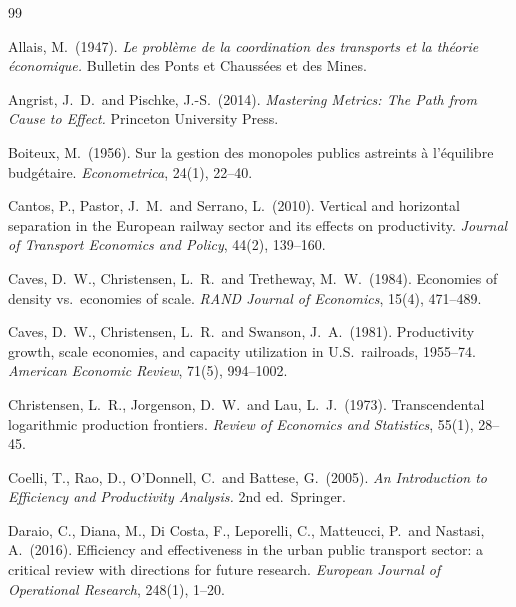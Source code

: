 \documentclass[11pt,a4paper]{article}
\begin{document}

{\small
\begin{thebibliography}{99}

Allais, M.\ (1947).
\textit{Le probl\`{e}me de la coordination des transports et la th\'{e}orie
\'{e}conomique.}
Bulletin des Ponts et Chauss\'{e}es et des Mines.

Angrist, J.~D.\ and Pischke, J.-S.\ (2014).
\textit{Mastering Metrics: The Path from Cause to Effect.}
Princeton University Press.

Boiteux, M.\ (1956).
Sur la gestion des monopoles publics astreints \`{a} l'\'{e}quilibre
budg\'{e}taire.
\textit{Econometrica}, 24(1), 22--40.

Cantos, P., Pastor, J.~M.\ and Serrano, L.\ (2010).
Vertical and horizontal separation in the European railway sector and
its effects on productivity.
\textit{Journal of Transport Economics and Policy}, 44(2), 139--160.

Caves, D.~W., Christensen, L.~R.\ and Tretheway, M.~W.\ (1984).
Economies of density vs.\ economies of scale.
\textit{RAND Journal of Economics}, 15(4), 471--489.

Caves, D.~W., Christensen, L.~R.\ and Swanson, J.~A.\ (1981).
Productivity growth, scale economies, and capacity utilization in U.S.\
railroads, 1955--74.
\textit{American Economic Review}, 71(5), 994--1002.

Christensen, L.~R., Jorgenson, D.~W.\ and Lau, L.~J.\ (1973).
Transcendental logarithmic production frontiers.
\textit{Review of Economics and Statistics}, 55(1), 28--45.

Coelli, T., Rao, D., O'Donnell, C.\ and Battese, G.\ (2005).
\textit{An Introduction to Efficiency and Productivity Analysis.}
2nd ed.\ Springer.

Daraio, C., Diana, M., Di Costa, F., Leporelli, C., Matteucci, P.\ and
Nastasi, A.\ (2016).
Efficiency and effectiveness in the urban public transport sector: a
critical review with directions for future research.
\textit{European Journal of Operational Research}, 248(1), 1--20.


\end{thebibliography}}
\end{document}
